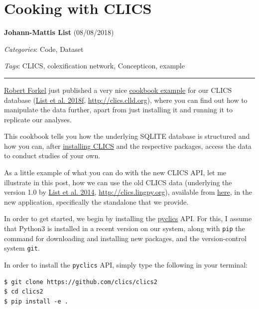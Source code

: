 \documentclass[
  english,
  a4paper,
  oneside,tablecaptionabove
]{scrbook}
\newcommand{\passthrough}[1]{#1}
\begin{document}
\hypertarget{cooking-with-clics}{%
\chapter{Cooking with CLICS}\label{cooking-with-clics}}

\textbf{Johann-Mattis List} (08/08/2018)

\emph{Categories}: Code, Dataset

\emph{Tags}: CLICS, colexification network, Concepticon, example

\begin{center}\rule{0.5\linewidth}{\linethickness}\end{center}

\href{https://github.com/xrotwang/}{Robert Forkel} just published a very
nice
\href{https://github.com/clics/clics2/tree/master/cookbook}{cookbook
example} for our CLICS database (\href{http://bibliography.lingpy.org?key=List2018f}{List et al. 2018f},
\url{http://clics.clld.org}), where you can find out how to manipulate
the data further, apart from just installing it and running it to
replicate our analyses.

This cookbook tells you how the underlying SQLITE database is structured
and how you can, after \href{https://github.com/clics/clics2}{installing
CLICS} and the respective packages, access the data to conduct studies
of your own.

As a little example of what you can do with the new CLICS API, let me
illustrate in this post, how we can use the old CLICS data (underlying
the version 1.0 by
\href{http://bibliography.lingpy.org?key=List2014f}{List et al. 2014},
\url{http://clics.lingpy.org}), available from
\href{https://github.com/clics/clics1}{here}, in the new application,
specifically the standalone that we provide.

\leavevmode\hypertarget{markdown}{}%
In order to get started, we begin by installing the
\href{https://github.com/clics/clics2}{pyclics} API. For this, I assume
that Python3 is installed in a recent version on our system, along with
\passthrough{\lstinline!pip!} the command for downloading and installing
new packages, and the version-control system
\passthrough{\lstinline!git!}.

In order to install the \passthrough{\lstinline!pyclics!} API, simply
type the following in your terminal:

\begin{lstlisting}
$ git clone https://github.com/clics/clics2
$ cd clics2
$ pip install -e .
\end{lstlisting}
\end{document}
